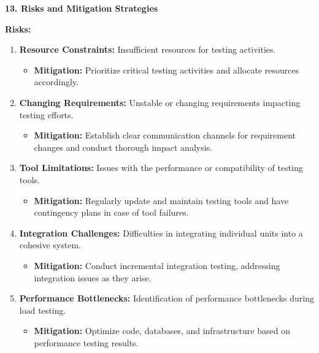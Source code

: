 \documentclass[
]{article}
\begin{document}
\textbf{13. Risks and Mitigation Strategies}

\textbf{Risks:}

\begin{enumerate}
\def\labelenumi{\arabic{enumi}.}
\item
  \textbf{Resource Constraints:} Insufficient resources for testing
  activities.

  \begin{itemize}
  \item
    \textbf{Mitigation:} Prioritize critical testing activities and
    allocate resources accordingly.
  \end{itemize}
\item
  \textbf{Changing Requirements:} Unstable or changing requirements
  impacting testing efforts.

  \begin{itemize}
  \item
    \textbf{Mitigation:} Establish clear communication channels for
    requirement changes and conduct thorough impact analysis.
  \end{itemize}
\item
  \textbf{Tool Limitations:} Issues with the performance or
  compatibility of testing tools.

  \begin{itemize}
  \item
    \textbf{Mitigation:} Regularly update and maintain testing tools and
    have contingency plans in case of tool failures.
  \end{itemize}
\item
  \textbf{Integration Challenges:} Difficulties in integrating
  individual units into a cohesive system.

  \begin{itemize}
  \item
    \textbf{Mitigation:} Conduct incremental integration testing,
    addressing integration issues as they arise.
  \end{itemize}
\item
  \textbf{Performance Bottlenecks:} Identification of performance
  bottlenecks during load testing.

  \begin{itemize}
  \item
    \textbf{Mitigation:} Optimize code, databases, and infrastructure
    based on performance testing results.
  \end{itemize}
\end{enumerate}
\end{document}
